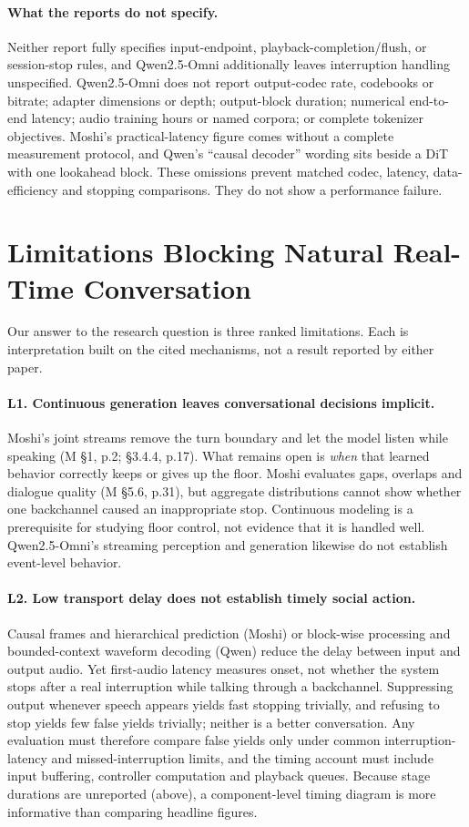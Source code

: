 \documentclass[11pt,a4paper,twocolumn]{article}
\newcommand{\M}{\textsc{M}}
\begin{document}
\paragraph{What the reports do not specify.} Neither report fully specifies input-endpoint, playback-completion/flush, or session-stop rules, and Qwen2.5-Omni additionally leaves interruption handling unspecified. Qwen2.5-Omni does not report output-codec rate, codebooks or bitrate; adapter dimensions or depth; output-block duration; numerical end-to-end latency; audio training hours or named corpora; or complete tokenizer objectives. Moshi's practical-latency figure comes without a complete measurement protocol, and Qwen's ``causal decoder'' wording sits beside a DiT with one lookahead block. These omissions prevent matched codec, latency, data-efficiency and stopping comparisons. They do not show a performance failure.

\section{Limitations Blocking Natural Real-Time Conversation}
\label{sec:limits}

Our answer to the research question is three ranked limitations. Each is interpretation built on the cited mechanisms, not a result reported by either paper.

\paragraph{L1. Continuous generation leaves conversational decisions implicit.} Moshi's joint streams remove the turn boundary and let the model listen while speaking (\M{} \S1, p.2; \S3.4.4, p.17). What remains open is \emph{when} that learned behavior correctly keeps or gives up the floor. Moshi evaluates gaps, overlaps and dialogue quality (\M{} \S5.6, p.31), but aggregate distributions cannot show whether one backchannel caused an inappropriate stop. Continuous modeling is a prerequisite for studying floor control, not evidence that it is handled well. Qwen2.5-Omni's streaming perception and generation likewise do not establish event-level behavior.

\paragraph{L2. Low transport delay does not establish timely social action.} Causal frames and hierarchical prediction (Moshi) or block-wise processing and bounded-context waveform decoding (Qwen) reduce the delay between input and output audio. Yet first-audio latency measures onset, not whether the system stops after a real interruption while talking through a backchannel. Suppressing output whenever speech appears yields fast stopping trivially, and refusing to stop yields few false yields trivially; neither is a better conversation. Any evaluation must therefore compare false yields only under common interruption-latency and missed-interruption limits, and the timing account must include input buffering, controller computation and playback queues. Because stage durations are unreported (above), a component-level timing diagram is more informative than comparing headline figures.
\end{document}
